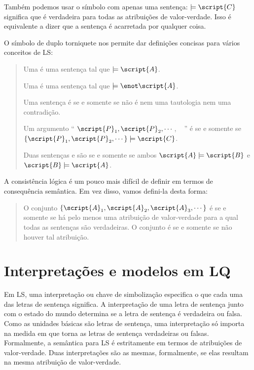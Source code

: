 Também podemos usar o símbolo com apenas uma sentença: $\models\script{C}$ significa que  é verdadeira para todas as atribuições de valor-verdade. Isso é equivalente a dizer que a sentença é acarretada por qualquer coisa.

O símbolo de duplo torniquete nos permite dar definições concisas para vários conceitos de LS:
\begin{quote}
Uma  é uma sentença   tal que $\models\script{A}$.

Uma  é uma sentença  tal que $\models\enot\script{A}$.

Uma sentença é  se e somente se não é nem uma tautologia nem uma contradição.

Um argumento `` $\script{P}_1, \script{P}_2, \cdots$, \therefore\  '' é  se e somente se $\{\script{P}_1,\script{P}_2,\cdots\}\models\script{C}$.

Duas sentenças  e  são  se e somente se ambos $\script{A}\models\script{B}$ e $\script{B}\models\script{A}$.
\end{quote}

A consistência lógica é um pouco mais difícil de definir em termos de consequência semântica. Em vez disso, vamos defini-la desta forma:

\begin{quote}
\label{def.consistencySL}
O conjunto $\{\script{A}_1,\script{A}_2,\script{A}_3,\cdots\}$ é  se e somente se há pelo menos uma atribuição de valor-verdade para a qual todas as sentenças são verdadeiras. O conjunto é  se e somente se não houver tal atribuição.
\end{quote}

\section{Interpretações e modelos em LQ}

Em LS, uma interpretação ou chave de simbolização especifica o que cada uma das letras de sentença significa. A interpretação de uma letra de sentença junto com o estado do mundo determina se a letra de sentença é verdadeira ou falsa.
Como as unidades básicas são letras de sentença, uma interpretação só importa na medida em que torna as letras de sentença verdadeiras ou falsas. Formalmente, a semântica para LS é estritamente em termos de atribuições de valor-verdade. Duas interpretações são as mesmas, formalmente, se elas resultam na mesma atribuição de valor-verdade.

